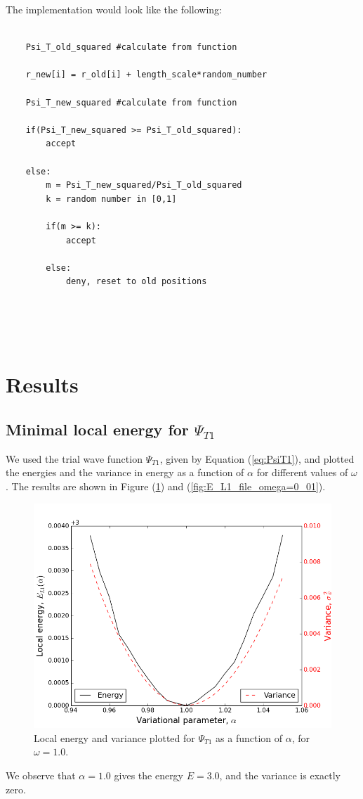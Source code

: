 \documentclass[norsk,a4paper,12pt]{article}
\begin{document}
\par 
\vspace{3mm}

The implementation would look like the following:

\begin{lstlisting}
    
    Psi_T_old_squared #calculate from function
    
    r_new[i] = r_old[i] + length_scale*random_number
    
    Psi_T_new_squared #calculate from function
    
    if(Psi_T_new_squared >= Psi_T_old_squared):
        accept
    
    else:
        m = Psi_T_new_squared/Psi_T_old_squared
        k = random number in [0,1]
        
        if(m >= k):
            accept
            
        else:
            deny, reset to old positions
    
    
    
    
\end{lstlisting}

\section{Results} \label{Results}
\subsection{Minimal local energy for $\Psi_{T1}$}

We used the trial wave function $\Psi_{T1}$, given by Equation (\ref{eq:PsiT1}), and plotted the energies and the variance in energy as a function of $\alpha$ for different values of $\omega$. The results are shown in Figure (\ref{fig:E_L1_file_omega=1_0}) and (\ref{fig:E_L1_file_omega=0_01}).

\begin{figure} [H]
    \centering
    \includegraphics[scale=0.65]{E_L1_variance_omega=1_0}
    \caption{Local energy and variance plotted  for $\Psi_{T1}$ as a function of $\alpha$, for $\omega = 1.0$.}
    \label{fig:E_L1_file_omega=1_0}
\end{figure} 
We observe that $\alpha = 1.0$ gives the energy $E=3.0$, and the variance is exactly zero.
\end{document}
